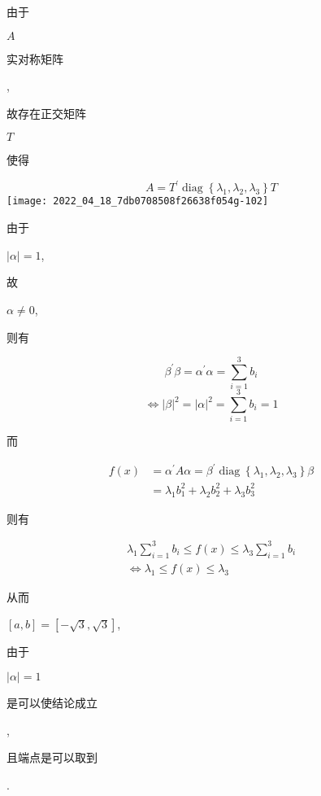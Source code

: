 \documentclass[10pt]{article}
\begin{document}
\begin{CJK}{UTF8}{mj}由于\end{CJK} $A$ \begin{CJK}{UTF8}{mj}实对称矩阵\end{CJK}, \begin{CJK}{UTF8}{mj}故存在正交矩阵\end{CJK} $T$ \begin{CJK}{UTF8}{mj}使得\end{CJK}
$$
A=T^{\prime} \operatorname{diag}\left\{\lambda_{1}, \lambda_{2}, \lambda_{3}\right\} T
$$
\texttt{[image: 2022\_04\_18\_7db0708508f26638f054g-102]}

\begin{CJK}{UTF8}{mj}由于\end{CJK} $|\alpha|=1$, \begin{CJK}{UTF8}{mj}故\end{CJK} $\alpha \neq 0$, \begin{CJK}{UTF8}{mj}则有\end{CJK}
$$
\beta^{\prime} \beta=\alpha^{\prime} \alpha=\sum_{i=1}^{3} b_{i}
$$
$$
\Leftrightarrow|\beta|^{2}=|\alpha|^{2}=\sum_{i=1}^{3} b_{i}=1
$$
\begin{CJK}{UTF8}{mj}而\end{CJK}
$$
\begin{aligned}
f(x) &=\alpha^{\prime} A \alpha=\beta^{\prime} \operatorname{diag}\left\{\lambda_{1}, \lambda_{2}, \lambda_{3}\right\} \beta \\
&=\lambda_{1} b_{1}^{2}+\lambda_{2} b_{2}^{2}+\lambda_{3} b_{3}^{2}
\end{aligned}
$$
\begin{CJK}{UTF8}{mj}则有\end{CJK}
$$
\begin{gathered}
\lambda_{1} \sum_{i=1}^{3} b_{i} \leq f(x) \leq \lambda_{3} \sum_{i=1}^{3} b_{i} \\
\Leftrightarrow \lambda_{1} \leq f(x) \leq \lambda_{3}
\end{gathered}
$$
\begin{CJK}{UTF8}{mj}从而\end{CJK} $[a, b]=[-\sqrt{3}, \sqrt{3}]$, \begin{CJK}{UTF8}{mj}由于\end{CJK} $|\alpha|=1$ \begin{CJK}{UTF8}{mj}是可以使结论成立\end{CJK}, \begin{CJK}{UTF8}{mj}且端点是可以取到\end{CJK}.
\end{document}
